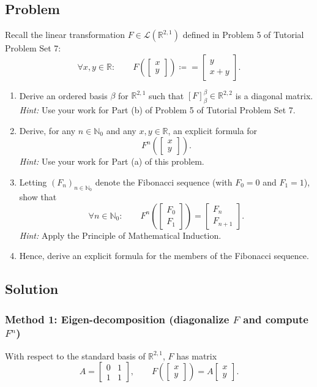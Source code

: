 \documentclass[12pt]{article}
\newcommand{\F}{\mathbb{F}}
\newcommand{\R}{\mathbb{R}}
\newcommand{\cL}{\mathcal{L}}
\newcommand{\df}{\coloneqq}
\begin{document}
\subsection{Problem}
Recall the linear transformation $F\in \cL(\R^{2,1})$ defined in Problem 5 of Tutorial Problem Set 7:
\[
\forall x,y\in\R:\qquad
F\!\left(\begin{bmatrix}x\\y\end{bmatrix}\right)\df
=
\begin{bmatrix}
y\\
x+y
\end{bmatrix}.
\]
\begin{enumerate}[label=(\alph*)]
\item Derive an ordered basis $\beta$ for $\R^{2,1}$ such that $[F]^{\beta}_{\beta}\in\R^{2,2}$ is a diagonal matrix.\\
\textit{Hint:} Use your work for Part (b) of Problem 5 of Tutorial Problem Set 7.
\item Derive, for any $n\in\mathbb{N}_0$ and any $x,y\in\R$, an explicit formula for
\[
F^n\!\left(\begin{bmatrix}x\\y\end{bmatrix}\right).
\]
\textit{Hint:} Use your work for Part (a) of this problem.
\item Letting $(F_n)_{n\in\mathbb{N}_0}$ denote the Fibonacci sequence (with $F_0=0$ and $F_1=1$), show that
\[
\forall n\in\mathbb{N}_0:\qquad
F^n\!\left(\begin{bmatrix}F_0\\F_1\end{bmatrix}\right)
=
\begin{bmatrix}F_n\\F_{n+1}\end{bmatrix}.
\]
\textit{Hint:} Apply the Principle of Mathematical Induction.
\item Hence, derive an explicit formula for the members of the Fibonacci sequence.
\end{enumerate}

\subsection{Solution}

\subsubsection{Method 1: Eigen-decomposition (diagonalize $F$ and compute $F^n$)}
With respect to the standard basis of $\R^{2,1}$, $F$ has matrix
\[
A=\begin{bmatrix}0&1\\1&1\end{bmatrix},
\qquad
F\!\left(\begin{bmatrix}x\\y\end{bmatrix}\right)=A\begin{bmatrix}x\\y\end{bmatrix}.
\]
\end{document}
